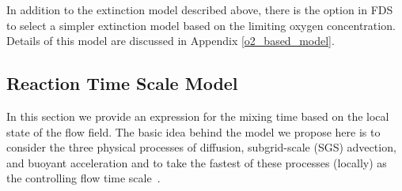 %
%
%

In addition to the extinction model described above, there is the option in FDS to select a simpler extinction model based on the limiting oxygen concentration. Details of this model are discussed in Appendix \ref{o2_based_model}.


\subsection{Reaction Time Scale Model}
\label{sec:reac_time_scale}

In this section we provide an expression for the mixing time based on the local state of the flow field.  The basic idea behind the model we propose here is to consider the three physical processes of diffusion, subgrid-scale (SGS) advection, and buoyant acceleration and to take the fastest of these processes (locally) as the controlling flow time scale~\cite{McDermott:2011}.


